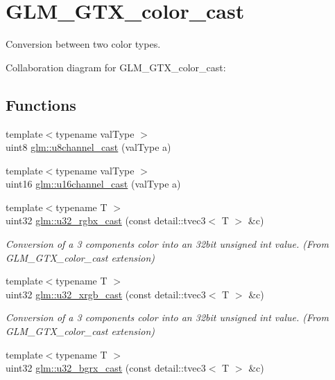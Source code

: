 \hypertarget{group__gtx__color__cast}{}\section{G\+L\+M\+\_\+\+G\+T\+X\+\_\+color\+\_\+cast}
\label{group__gtx__color__cast}


Conversion between two color types.  


Collaboration diagram for G\+L\+M\+\_\+\+G\+T\+X\+\_\+color\+\_\+cast\+:
\subsection*{Functions}
\begin{DoxyCompactItemize}
\item 
{\footnotesize template$<$typename val\+Type $>$ }\\uint8 \hyperlink{group__gtx__color__cast_ga65c8867c34193951a87cbe6ad3492119}{glm\+::u8channel\+\_\+cast} (val\+Type a)
\item 
{\footnotesize template$<$typename val\+Type $>$ }\\uint16 \hyperlink{group__gtx__color__cast_ga49e636906dcf04bed0e149c71761fb0a}{glm\+::u16channel\+\_\+cast} (val\+Type a)
\item 
\hypertarget{group__gtx__color__cast_gab660e32dbf9e1ecfad0613a3011c46fe}{}{\footnotesize template$<$typename T $>$ }\\uint32 \hyperlink{group__gtx__color__cast_gab660e32dbf9e1ecfad0613a3011c46fe}{glm\+::u32\+\_\+rgbx\+\_\+cast} (const detail\+::tvec3$<$ T $>$ \&c)\label{group__gtx__color__cast_gab660e32dbf9e1ecfad0613a3011c46fe}

\begin{DoxyCompactList}\small\item\em Conversion of a 3 components color into an 32bit unsigned int value. (From G\+L\+M\+\_\+\+G\+T\+X\+\_\+color\+\_\+cast extension) \end{DoxyCompactList}\item 
\hypertarget{group__gtx__color__cast_ga49b0fd47346b739d1732a26fc94edf87}{}{\footnotesize template$<$typename T $>$ }\\uint32 \hyperlink{group__gtx__color__cast_ga49b0fd47346b739d1732a26fc94edf87}{glm\+::u32\+\_\+xrgb\+\_\+cast} (const detail\+::tvec3$<$ T $>$ \&c)\label{group__gtx__color__cast_ga49b0fd47346b739d1732a26fc94edf87}

\begin{DoxyCompactList}\small\item\em Conversion of a 3 components color into an 32bit unsigned int value. (From G\+L\+M\+\_\+\+G\+T\+X\+\_\+color\+\_\+cast extension) \end{DoxyCompactList}\item 
\hypertarget{group__gtx__color__cast_ga5169191468b1be24c2af1b679c9f4b3f}{}{\footnotesize template$<$typename T $>$ }\\uint32 \hyperlink{group__gtx__color__cast_ga5169191468b1be24c2af1b679c9f4b3f}{glm\+::u32\+\_\+bgrx\+\_\+cast} (const detail\+::tvec3$<$ T $>$ \&c)\label{group__gtx__color__cast_ga5169191468b1be24c2af1b679c9f4b3f}


\end{DoxyCompactItemize}
